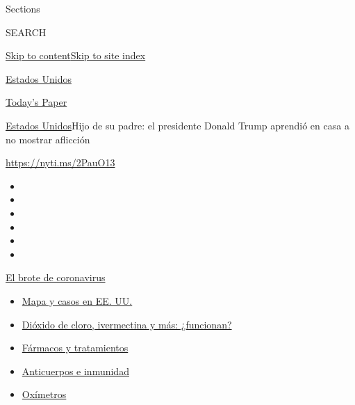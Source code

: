 Sections

SEARCH

\protect\hyperlink{site-content}{Skip to
content}\protect\hyperlink{site-index}{Skip to site index}

\href{https://www.nytimes.com/es/section/estados-unidos}{Estados Unidos}

\href{https://myaccount.nytimes.com/auth/login?response_type=cookie\&client_id=vi}{}

\href{https://www.nytimes.com/section/todayspaper}{Today's Paper}

\href{/es/section/estados-unidos}{Estados Unidos}\textbar{}Hijo de su
padre: el presidente Donald Trump aprendió en casa a no mostrar
aflicción

\url{https://nyti.ms/2PauO13}

\begin{itemize}
\item
\item
\item
\item
\item
\item
\end{itemize}

\href{https://www.nytimes.com/es/spotlight/coronavirus?action=click\&pgtype=Article\&state=default\&region=TOP_BANNER\&context=storylines_menu}{El
brote de coronavirus}

\begin{itemize}
\tightlist
\item
  \href{https://www.nytimes.com/es/interactive/2020/espanol/mundo/coronavirus-en-estados-unidos.html?action=click\&pgtype=Article\&state=default\&region=TOP_BANNER\&context=storylines_menu}{Mapa
  y casos en EE. UU.}
\item
  \href{https://www.nytimes.com/es/2020/07/23/espanol/america-latina/bolivia-cloro-coronavirus-ivermectina.html?action=click\&pgtype=Article\&state=default\&region=TOP_BANNER\&context=storylines_menu}{Dióxido
  de cloro, ivermectina y más: ¿funcionan?}
\item
  \href{https://www.nytimes.com/es/interactive/2020/science/coronavirus-tratamientos-curas.html?action=click\&pgtype=Article\&state=default\&region=TOP_BANNER\&context=storylines_menu}{Fármacos
  y tratamientos}
\item
  \href{https://www.nytimes.com/es/2020/07/28/espanol/ciencia-y-tecnologia/anticuerpos-coronavirus-inmunidad.html?action=click\&pgtype=Article\&state=default\&region=TOP_BANNER\&context=storylines_menu}{Anticuerpos
  e inmunidad}
\item
  \href{https://www.nytimes.com/es/2020/04/29/espanol/estilos-de-vida/oximetro-para-que-sirve.html?action=click\&pgtype=Article\&state=default\&region=TOP_BANNER\&context=storylines_menu}{Oxímetros}
\end{itemize}

